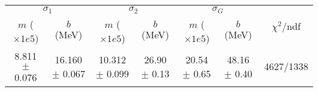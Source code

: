 \begin{tabular}{cc|cc|cc||c}
\multicolumn{2}{c|}{$\sigma_1$} & \multicolumn{2}{|c}{$\sigma_2$} & \multicolumn{2}{|c}{$\sigma_G$}  & \multirow{2}{*}{$\chi^2/$ndf}\\
$m$ ($\times1e5$) & $b$ (MeV) & $m$ ($\times1e5$) & $b$ (MeV) & $m$ ($\times1e5$) & $b$ (MeV) & \\
\hline
8.811 $\pm$ 0.076 & 16.160 $\pm$ 0.067 & 10.312 $\pm$ 0.099 & 26.90 $\pm$ 0.13 & 20.54 $\pm$ 0.65 & 48.16 $\pm$ 0.40 & 4627/1338\\
\end{tabular}
